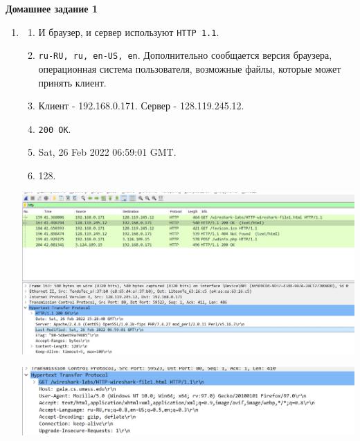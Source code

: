 \documentclass[12pt]{article}
\def\THEME{Домашнее задание 1}
\begin{document}
\begin{center}
\vspace*{0mm}
{\LARGE \bf \THEME}
\end{center}

\begin{enumerate}[leftmargin=0pt, rightmargin=0pt]

\item

\begin{enumerate}[leftmargin=20pt, rightmargin=0pt, itemsep=7pt]

\item

И браузер, и сервер используют \texttt{HTTP 1.1}.

\item

\texttt{ru-RU, ru, en-US, en}. Дополнительно сообщается версия браузера, операционная система пользователя, возможные файлы, которые может принять клиент.

\item

Клиент - 192.168.0.171. Сервер - 128.119.245.12.

\item

\texttt{200 OK}.

\item

Sat, 26 Feb 2022 06:59:01 GMT.

\item

128.

\end{enumerate}

\includegraphics[scale=0.5]{1.1.png}

\includegraphics[scale=0.5]{1.2.png}


\end{enumerate}
\end{document}
